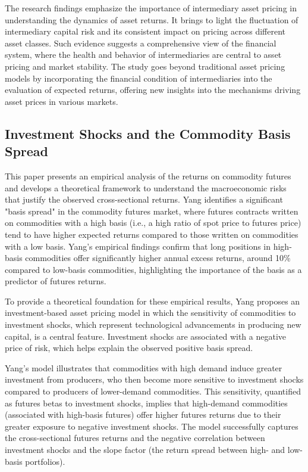 \documentclass{article}
\begin{document}
The research findings emphasize the importance of intermediary asset pricing in understanding the dynamics of asset returns. It brings to light the fluctuation of intermediary capital risk and its consistent impact on pricing across different asset classes. Such evidence suggests a comprehensive view of the financial system, where the health and behavior of intermediaries are central to asset pricing and market stability. The study goes beyond traditional asset pricing models by incorporating the financial condition of intermediaries into the evaluation of expected returns, offering new insights into the mechanisms driving asset prices in various markets.

\subsection{Investment Shocks and the Commodity Basis Spread}

This paper presents an empirical analysis of the returns on commodity futures and develops a theoretical framework to understand the macroeconomic risks that justify the observed cross-sectional returns. Yang identifies a significant "basis spread" in the commodity futures market, where futures contracts written on commodities with a high basis (i.e., a high ratio of spot price to futures price) tend to have higher expected returns compared to those written on commodities with a low basis. Yang's empirical findings confirm that long positions in high-basis commodities offer significantly higher annual excess returns, around 10\% compared to low-basis commodities, highlighting the importance of the basis as a predictor of futures returns.

To provide a theoretical foundation for these empirical results, Yang proposes an investment-based asset pricing model in which the sensitivity of commodities to investment shocks, which represent technological advancements in producing new capital, is a central feature. Investment shocks are associated with a negative price of risk, which helps explain the observed positive basis spread.

Yang's model illustrates that commodities with high demand induce greater investment from producers, who then become more sensitive to investment shocks compared to producers of lower-demand commodities. This sensitivity, quantified as futures betas to investment shocks, implies that high-demand commodities (associated with high-basis futures) offer higher futures returns due to their greater exposure to negative investment shocks. The model successfully captures the cross-sectional futures returns and the negative correlation between investment shocks and the slope factor (the return spread between high- and low-basis portfolios).
\end{document}
